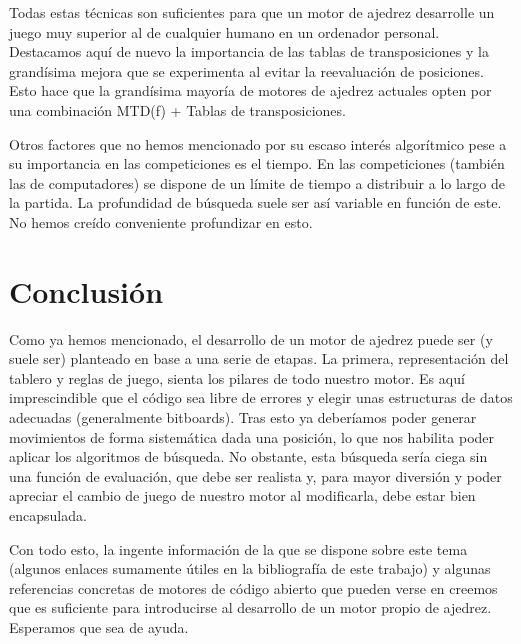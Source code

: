 \documentclass[letterpaper,12pt]{article}
\begin{document}
Todas estas técnicas son suficientes para que un motor de ajedrez desarrolle un juego muy 
superior al de cualquier humano en un ordenador personal. Destacamos aquí de nuevo la
importancia de las tablas de transposiciones y la grandísima mejora que se experimenta al
evitar la reevaluación de posiciones. Esto hace que la grandísima mayoría de motores de 
ajedrez actuales opten por una combinación MTD(f) + Tablas de transposiciones.

Otros factores que no hemos mencionado por su escaso interés algorítmico pese a su importancia
en las competiciones es el tiempo. En las competiciones (también las de computadores) se dispone
de un límite de tiempo a distribuir a lo largo de la partida. La profundidad de búsqueda suele
ser así variable en función de este. No hemos creído conveniente profundizar en esto.

\newpage
\section{Conclusión}

Como ya hemos mencionado, el desarrollo de un motor de ajedrez puede ser (y suele ser) planteado
en base a una serie de etapas. La primera, representación del tablero y reglas de juego, sienta
los pilares de todo nuestro motor. Es aquí imprescindible que el código sea libre de errores y 
elegir unas estructuras de datos adecuadas (generalmente bitboards). Tras esto ya deberíamos
poder generar movimientos de forma sistemática dada una posición, lo que nos habilita poder
aplicar los algoritmos de búsqueda. No obstante, esta búsqueda sería ciega sin una función de 
evaluación, que debe ser realista y, para mayor diversión y poder apreciar el cambio de juego
de nuestro motor al modificarla, debe estar bien encapsulada.

Con todo esto, la ingente información de la que se dispone sobre este tema (algunos enlaces
sumamente útiles en la bibliografía de este trabajo) y algunas referencias concretas de 
motores de código abierto que pueden verse en \cite{Open Source Chess Engines} creemos que 
es suficiente para introducirse al desarrollo de un motor propio de ajedrez. Esperamos que 
sea de ayuda.

\end{document}
